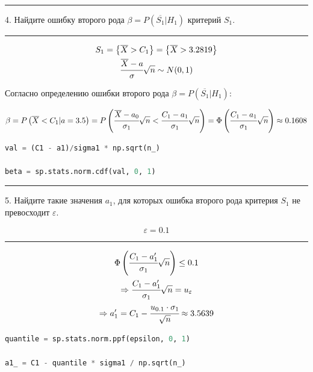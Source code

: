 \documentclass[a4paper, 14pt]{extarticle}
\begin{document}
\rule{\linewidth}{0.1mm}

4. Найдите ошибку второго рода $\beta = P(\overline{S_1} | H_1)$ критерий $S_1$.

\rule{\linewidth}{0.1mm}

\begin{gather*}
    S_1 = \left\{ \overline{X} > C_1 \right\} = \left\{ \overline{X} > 3.2819 \right\} \\
    \cfrac{\overline{X} - a}{\sigma} \sqrt{n} \sim N(0, 1)
\end{gather*}

Согласно определению ошибки второго рода $\beta = P(\overline{S_1}|H_1)$:

\begin{equation*}
    \beta = P\left(\overline{X} < C_1 | a = 3.5\right) = P\left(\cfrac{\overline{X} - a_0}{\sigma_1}\sqrt{n} < 
    \cfrac{C_1 - a_1}{\sigma_1}\sqrt{n}\right) = \Phi\left(\cfrac{C_1 - a_1}{\sigma_1}\sqrt{n}\right) 
    \approx 0.1608
\end{equation*}

\begin{center}
    \begin{lstlisting}[language=Python]
val = (C1 - a1)/sigma1 * np.sqrt(n_)

beta = sp.stats.norm.cdf(val, 0, 1)
    \end{lstlisting}
\end{center}

\rule{\linewidth}{0.1mm}

5. Найдите такие значения $a_1$, для которых ошибка второго рода критерия $S_1$ не 
превосходит $\varepsilon$.

\begin{equation*}
    \varepsilon = 0.1
\end{equation*}

\rule{\linewidth}{0.1mm}

\begin{gather*}
    \Phi\left(\cfrac{C_1 - a_1'}{\sigma_1} \sqrt{n}\right) \leq 0.1 \\
    \Rightarrow \cfrac{C_1 - a_1'}{\sigma_1} \sqrt{n} = u_{\varepsilon} \\
    \Rightarrow a_1' = C_1 - \cfrac{u_{0.1} \cdot \sigma_1}{\sqrt{n}} \approx 3.5639
\end{gather*}

\begin{center}
    \begin{lstlisting}[language=Python]
quantile = sp.stats.norm.ppf(epsilon, 0, 1)

a1_ = C1 - quantile * sigma1 / np.sqrt(n_)
    \end{lstlisting}
\end{center}
\end{document}
